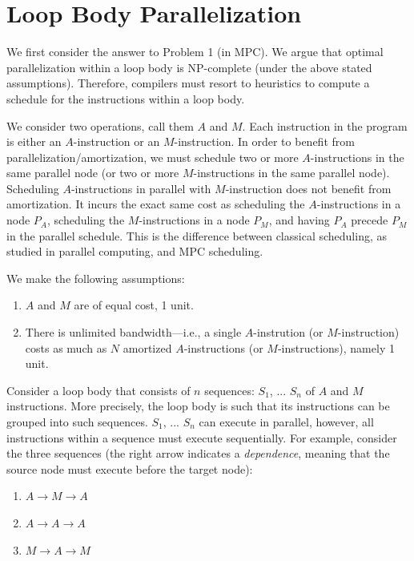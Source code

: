 \documentclass[sigconf, screen, natbib=false, dvipsnames, table]{acmart}
\theoremstyle{definition}
\begin{document}
\section{Loop Body Parallelization}
\label{sec:parallelization_within_loop}
%

We first consider the answer to Problem 1 (in MPC). 
We argue that optimal parallelization within a loop body is NP-complete (under the above stated assumptions). 
Therefore, compilers must resort to heuristics to compute a schedule for the instructions within a loop body.

We consider two operations, call them $A$ and $M$. Each instruction in the program is either an $A$-instruction or
an $M$-instruction. In order to benefit from parallelization/amortization, we must schedule two or more 
$A$-instructions in the same parallel node (or two or more $M$-instructions in the same parallel node). 
Scheduling $A$-instructions in parallel with $M$-instruction does not benefit from amortization.
It incurs the exact same cost as scheduling the $A$-instructions in a node $P_A$, scheduling the $M$-instructions 
in a node $P_M$, and having $P_A$ precede $P_M$ in the parallel schedule. This is the difference 
between classical scheduling, as studied in parallel computing, and MPC scheduling. 

We make the following assumptions:

\begin{enumerate}

\item $A$ and $M$ are of equal cost, 1 unit.
\item There is unlimited bandwidth---i.e., a single $A$-instrution (or $M$-instruction) costs as much as $N$ amortized $A$-instructions 
(or $M$-instructions), namely 1 unit.
 
\end{enumerate}

Consider a loop body that consists of $n$ sequences: $S_1$, ... $S_n$ of $A$ and $M$ instructions. 
More precisely, the loop body is such that its instructions can be grouped into such sequences. 
$S_1$, ... $S_n$ can execute in parallel, however, all instructions within a sequence must 
execute sequentially. For example, consider the three sequences (the right arrow indicates a \emph{dependence},
meaning that the source node must execute before the target node): 
\begin{enumerate}
\item $A \rightarrow M \rightarrow A$
\item $A \rightarrow A \rightarrow A$
\item $M \rightarrow A \rightarrow M$
\end{enumerate} 
\end{document}
